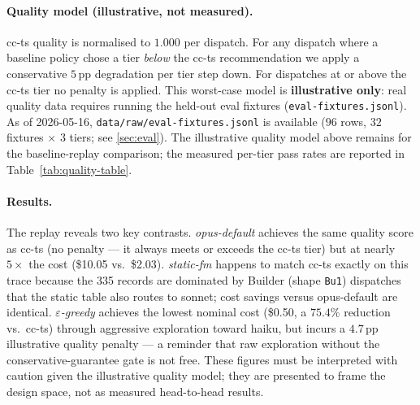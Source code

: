 \paragraph{Quality model (illustrative, not measured).}
cc-ts quality is normalised to $1.000$ per dispatch.  For any dispatch
where a baseline policy chose a tier \emph{below} the cc-ts recommendation
we apply a conservative $5\,\mathrm{pp}$ degradation per tier step down.
For dispatches at or above the cc-ts tier no penalty is applied.  This
worst-case model is \textbf{illustrative only}: real quality data requires
running the held-out eval fixtures (\texttt{eval-fixtures.jsonl}).
As of 2026-05-16, \texttt{data/raw/eval-fixtures.jsonl} is available
($96$ rows, $32$ fixtures $\times$ $3$ tiers; see \cref{sec:eval}).
The illustrative quality model above remains for the baseline-replay
comparison; the measured per-tier pass rates are reported in Table~\ref{tab:quality-table}.

\paragraph{Results.}



\noindent
The replay reveals two key contrasts.  \emph{opus-default} achieves the
same quality score as cc-ts (no penalty — it always meets or exceeds the
cc-ts tier) but at nearly $5\times$ the cost (\$10.05 vs.\ \$2.03).
\emph{static-fm} happens to match cc-ts exactly on this trace because the
335 records are dominated by Builder (shape \texttt{Bu1}) dispatches that
the static table also routes to sonnet; cost savings versus opus-default
are identical.  \emph{$\varepsilon$-greedy} achieves the lowest nominal
cost (\$0.50, a $75.4\%$ reduction vs.\ cc-ts) through aggressive
exploration toward haiku, but incurs a $4.7\,\mathrm{pp}$ illustrative
quality penalty — a reminder that raw exploration without the
conservative-guarantee gate is not free.  These figures must be
interpreted with caution given the illustrative quality model; they are
presented to frame the design space, not as measured head-to-head results.
